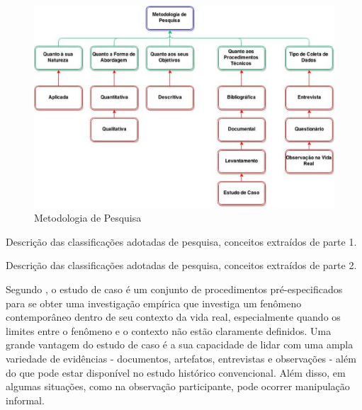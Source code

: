 \begin{figure}[h!]
\centering
\includegraphics[keepaspectratio=false,scale=0.5]{figuras/figuras_nilton/selecaoMetodologica.eps}
\caption{Metodologia de Pesquisa}
\label{7eixosqualidade}
\end{figure}

\begin{table}[!ht]
	\begin{center}
	
	 
	\caption{Descrição das classificações adotadas de pesquisa, conceitos extraídos de   parte 1.}
	\label{tab:descricaoMetodologia}
	\end{center}
	\end{table}	
	\FloatBarrier
	
	
	
	\begin{table}[!ht]
	\begin{center}
	
	 
	\caption{Descrição das classificações adotadas de pesquisa, conceitos extraídos de   parte 2.}
	\label{tab:descricaoMetodologia2}
	\end{center}
	\end{table}	
	\FloatBarrier

Segundo \cite{yin2001estudo}, o estudo de caso é um conjunto de procedimentos pré-especificados para se obter uma investigação empírica que investiga um fenômeno contemporâneo dentro de seu contexto da vida real, especialmente quando os limites entre o fenômeno e o contexto não estão claramente definidos. Uma grande vantagem do estudo de caso é a sua capacidade de lidar com uma ampla variedade de evidências - documentos, artefatos, entrevistas e observações - além do que pode estar disponível no estudo histórico convencional. Além disso, em algumas situações, como na observação participante, pode ocorrer manipulação informal.

